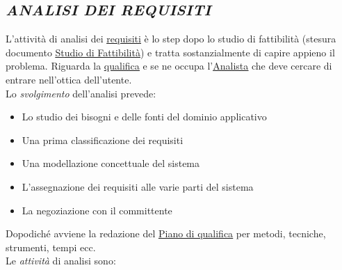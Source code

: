 		\subsection{\emph{ANALISI DEI REQUISITI}}  \label{analisideirequisiti} %
		L'attività di analisi dei \underline{\hyperref[requirements]{requisiti}} è lo step dopo lo studio di fattibilità (stesura documento \underline{\hyperref[studiofattibilita]{Studio di Fattibilità}}) e tratta sostanzialmente di capire appieno il problema.
		Riguarda la \underline{\hyperref[qualifica]{qualifica}} e se ne occupa l'\underline{\hyperref[analista]{Analista}} che deve cercare di entrare nell'ottica dell'utente. \\
		Lo \textit{svolgimento} dell'analisi prevede:
		 \begin{itemize}
			 \item Lo studio dei bisogni e delle fonti del dominio applicativo
			 \item Una prima classificazione dei requisiti
			 \item Una modellazione concettuale del sistema
			 \item L'assegnazione dei requisiti alle varie parti del sistema
			 \item La negoziazione con il committente
		 \end{itemize}
		Dopodiché avviene la redazione del \underline{\hyperref[pianoqualifica]{Piano di qualifica}} per metodi, tecniche, strumenti, tempi ecc. \\
		Le \textit{attività} di analisi sono:
